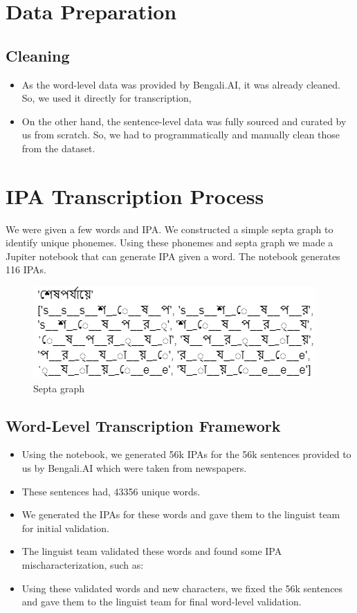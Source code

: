 \section{Data Preparation}

\subsection{Cleaning}
\begin{itemize}
    \item As the word-level data was provided by Bengali.AI, it was already cleaned. So, we used it directly for transcription,
    \item On the other hand, the sentence-level data was fully sourced and curated by us from scratch. So, we had to programmatically and manually clean those from the dataset.
\end{itemize}

\section{IPA Transcription Process}

We were given a few words and IPA. We constructed a simple septa graph to identify unique phonemes. Using these phonemes and septa graph we made a Jupiter notebook that can generate IPA given a word. The notebook generates 116 IPAs.
        \begin{figure}[h!]
            \centering
            \includegraphics[scale=0.8]{Images/Screenshot/septa-graph.png}
                \caption{Septa graph}
            \label{fig: Septa graph}
        \end{figure}

\subsection{Word-Level Transcription Framework}
\begin{itemize}
    \item Using the notebook, we generated 56k IPAs for the 56k sentences provided to us by Bengali.AI which were taken from newspapers.
    \item These sentences had, 43356 unique words.
    \item We generated the IPAs for these words and gave them to the linguist team for initial validation.
    \item The linguist team validated these words and found some IPA mischaracterization, such as:
    \item Using these validated words and new characters, we fixed the 56k sentences and gave them to the linguist team for final word-level validation.
\end{itemize}
\newpage
